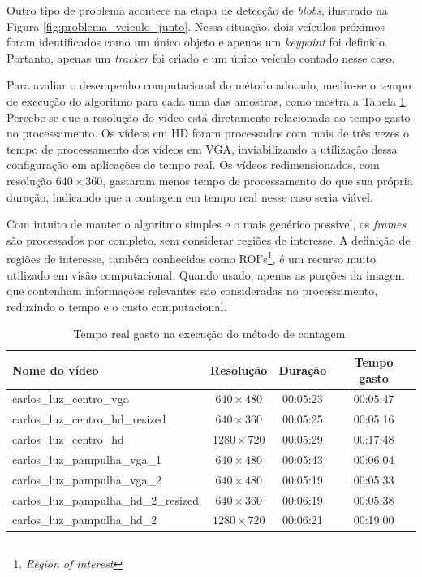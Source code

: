 Outro tipo de problema acontece na etapa de detecção de \textit{blobs}, ilustrado na Figura \ref{fig:problema_veiculo_junto}. Nessa situação, dois veículos próximos foram identificados como um único objeto e apenas um \textit{keypoint} foi definido. Portanto, apenas um \textit{tracker} foi criado e um único veículo contado nesse caso.

Para avaliar o desempenho computacional do método adotado, mediu-se o tempo de execução do algoritmo para cada uma das amostras, como mostra a Tabela \ref{tab:resultados_tempo}. Percebe-se que a resolução do vídeo está diretamente relacionada ao tempo gasto no processamento. Os vídeos em HD foram processados com mais de três vezes o tempo de processamento dos vídeos em VGA, inviabilizando a utilização dessa configuração em aplicações de tempo real. Os vídeos redimensionados, com resolução $ 640\times 360 $, gastaram menos tempo de processamento do que sua própria duração, indicando que a contagem em tempo real nesse caso seria viável.

Com intuito de manter o algoritmo simples e o mais genérico possível, os \textit{frames} são processados por completo, sem considerar regiões de interesse. A definição de regiões de interesse, também conhecidas como ROI's\footnote{\textit{Region of interest}}, é um recurso muito utilizado em visão computacional. Quando usado, apenas as porções da imagem que contenham informações relevantes são consideradas no processamento, reduzindo o tempo e o custo computacional.

\begin{table}[ht]
  \caption{Tempo real gasto na execução do método de contagem.}
  \label{tab:resultados_tempo}
  \begin{center}
    \begin{tabular}{lccc}
    \toprule
    \textbf{Nome do vídeo} & \textbf{Resolução} & \textbf{Duração} & \textbf{Tempo gasto} \\
    \midrule
      carlos\_luz\_centro\_vga & $ 640\times 480 $ & 00:05:23 & 00:05:47 \\
      carlos\_luz\_centro\_hd\_resized & $ 640\times 360 $ & 00:05:25 & 00:05:16 \\
      carlos\_luz\_centro\_hd & $ 1280\times 720 $ & 00:05:29 & 00:17:48 \\
      carlos\_luz\_pampulha\_vga\_1 & $ 640\times 480 $ & 00:05:43 & 00:06:04 \\
      carlos\_luz\_pampulha\_vga\_2 & $ 640\times 480 $ & 00:05:19 & 00:05:33 \\
      carlos\_luz\_pampulha\_hd\_2\_resized & $ 640\times 360 $ & 00:06:19 & 00:05:38 \\
      carlos\_luz\_pampulha\_hd\_2 & $ 1280\times 720 $ & 00:06:21 & 00:19:00 \\
    \bottomrule
    \end{tabular}
  \end{center}
\end{table}




























